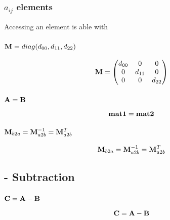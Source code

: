 \subsubsection*{$a_{ij}$ elements}
Accessing an element is able with

\subsubsection*{$\mathbf{M} = diag(d_{00}, d_{11}, d_{22})$}
\begin{equation}
\mathbf{M} = \begin{pmatrix}
d_{00} & 0 & 0 \\
0 & d_{11} & 0 \\
0 & 0 & d_{22}
\end{pmatrix}
\end{equation}

\subsubsection*{$\mathbf{A} = \mathbf{B}$}
\begin{equation}
\mathbf{mat1} = \mathbf{mat2}
\end{equation}


\subsubsection*{$\mathbf{M}_{b2a} = \mathbf{M}_{a2b}^{-1} = \mathbf{M}_{a2b}^{T}$}
\begin{equation}
\mathbf{M}_{b2a} = \mathbf{M}_{a2b}^{-1} = \mathbf{M}_{a2b}^{T}
\end{equation}

\subsection{- Subtraction}
\subsubsection*{$\mathbf{C} = \mathbf{A} - \mathbf{B}$}
\begin{equation}
\mathbf{C} = \mathbf{A} - \mathbf{B}
\end{equation}



